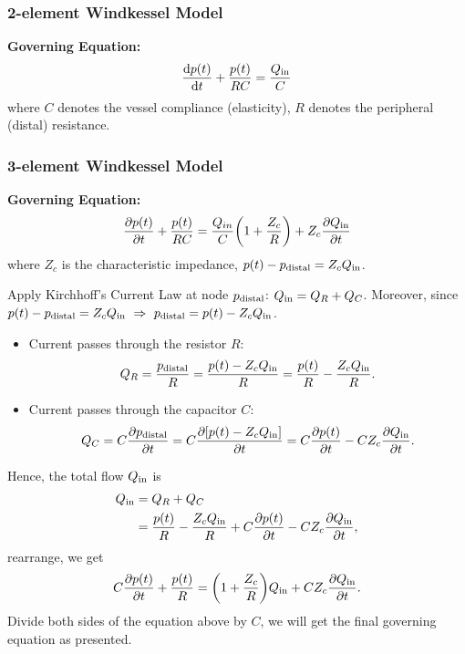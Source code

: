 \documentclass[a4paper]{article}
\begin{document}
\subsubsection*{2-element Windkessel Model}
\begin{minipage}{0.5\textwidth}

\end{minipage}
\hfill
\begin{minipage}{0.5\textwidth}
\textbf{Governing Equation:}
\[\frac{\mathrm{d}p(t)}{\mathrm{d}t} + \frac{p(t)}{RC} = \frac{Q_{\rm in}}{C}\]
where $C$ denotes the vessel compliance (elasticity), $R$ denotes the peripheral (distal) resistance.
\end{minipage}

\subsubsection*{3-element Windkessel Model} 
\begin{minipage}{0.5\textwidth}

\end{minipage}
\hfill
\begin{minipage}{0.5\textwidth}
\textbf{Governing Equation:}
\[
    \frac{\partial p(t)}{\partial t}
    + \frac{p(t)}{RC} 
    = \frac{Q_{in}}{C} \bigg(1+\frac{Z_{c}}{R}\bigg) 
    + Z_{c} \frac{\partial Q_{\rm in}}{\partial t}
\]
where $Z_{c}$ is the characteristic impedance, $p(t)-p_{\rm distal} = Z_{c}Q_{\rm in}$.
\end{minipage}

\begin{tcolorbox}[title=\textbf{Derivation}, breakable]
    Apply Kirchhoff's Current Law at node $p_{\rm distal}$: $Q_{\rm in} = Q_{R} + Q_{C}$. Moreover, since $p(t)-p_{\rm distal} = Z_{c}Q_{\rm in} \ \Rightarrow \ p_{\rm distal} = p(t) - Z_{c}Q_{\rm in}$.
    \begin{itemize}
        \item Current passes through the resistor $R$:
        \[
            Q_{R} = \frac{p_{\rm distal}}{R} = \frac{p(t) - Z_{c}Q_{\rm in}}{R} = \frac{p(t)}{R} - \frac{Z_{c}Q_{\rm in}}{R}.
        \]
        \item Current passes through the capacitor $C$:
        \[
            Q_{C} = C \frac{\partial p_{\rm distal}}{\partial t} = C \frac{\partial [p(t) - Z_{c}Q_{\rm in}]}{\partial t} = C \frac{\partial p(t)}{\partial t} - CZ_{c}\frac{\partial Q_{\rm in}}{\partial t}.
        \]
    \end{itemize}
    Hence, the total flow $Q_{\rm in}$ is
    \begin{align*}
        Q_{\rm in} 
        & = Q_{R} + Q_{C} \\
        & = \frac{p(t)}{R} - \frac{Z_{c}Q_{\rm in}}{R} + C \frac{\partial p(t)}{\partial t} - CZ_{c}\frac{\partial Q_{\rm in}}{\partial t},
    \end{align*}
    rearrange, we get
    \[
        C\frac{\partial p(t)}{\partial t} 
        + \frac{p(t)}{R} 
        = \bigg( 1+\frac{Z_c}{R} \bigg) Q_{\rm in} + C Z_c \frac{\partial Q_{\rm in}}{\partial t}.
    \]
    Divide both sides of the equation above by $C$, we will get the final governing equation as presented.
\end{tcolorbox}
\end{document}
